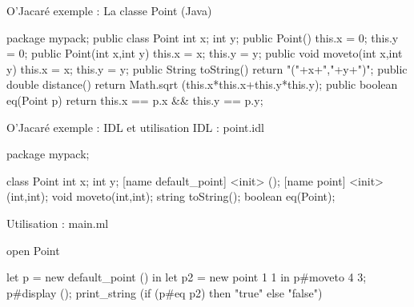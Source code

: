 \documentclass[xcolor={table,dvipsnames}]{beamer}
\begin{document}
\begin{frame}[fragile]{O'Jacaré exemple : La classe Point (Java)}

\bigskip

\begin{javaEx} 
  package mypack;
  public class Point {
    int x;
    int y;
    public Point() { 
      this.x = 0;
      this.y = 0;
    }
    public Point(int x,int y) {
      this.x = x;
      this.y = y;
    }
    public void moveto(int x,int y){
      this.x = x;
      this.y = y;
    }
    public String toString() {
      return "("+x+","+y+")";
    }
    public double distance() {
      return Math.sqrt (this.x*this.x+this.y*this.y);
    }
    public boolean eq(Point p) {
      return this.x == p.x  && this.y == p.y;
    }
  }
\end{javaEx}

\end{frame}





\begin{frame}[fragile]{O'Jacaré exemple : IDL et utilisation}
  IDL : point.idl
\begin{idlEx} 
package mypack;

class Point {
  int x;
  int y; 
  [name default_point] <init> ();
  [name point] <init> (int,int);
  void moveto(int,int);
  string toString();
  boolean eq(Point);
}
\end{idlEx}

Utilisation : main.ml
\begin{OCamlEx}
  open Point

  let p = new default_point () in
  let p2 = new point 1 1 in
  p#moveto 4 3;
  p#display ();
  print_string (if (p#eq p2) then "true" else "false")
\end{OCamlEx}
\end{frame}
\end{document}
